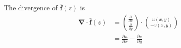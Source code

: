 \documentclass[preview]{standalone}
\begin{document}
\begin{center}
The divergence of $\bar{\mathbf{f}}(z)$ is \begin{align*} \mathbf{\nabla} \cdot \bar{\mathbf{f}}(z) &= {\frac{\partial}{\partial x} \choose \frac{\partial}{\partial y}} \cdot {u(x,y)\choose -v(x,y)} \\ &= \frac{\partial u}{\partial x} - \frac{\partial v}{\partial y} \end{align*}
\end{center}
\end{document}
